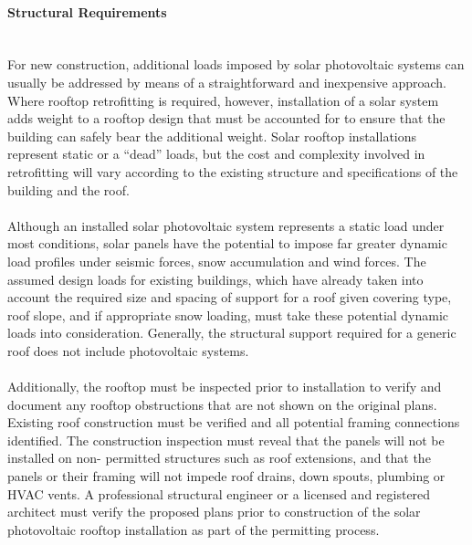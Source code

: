 \paragraph{Structural Requirements}\mbox{ }\\
For new construction, additional loads imposed by solar photovoltaic systems can usually be addressed by means of a straightforward and inexpensive approach. Where rooftop retrofitting is required, however, installation of a solar system adds weight to a rooftop design that must be accounted for to ensure that the building can safely bear the additional weight. Solar rooftop installations represent static or a “dead” loads, but the cost and complexity involved in retrofitting will vary according to the existing structure and specifications of the building and the roof.
\\\\
\noindent Although an installed solar photovoltaic system represents a static load under most conditions, solar panels have the potential to impose far greater dynamic load profiles under seismic forces, snow accumulation and wind forces. The assumed design loads for existing buildings, which have already taken into account the required size and spacing of support for a roof given covering type, roof slope, and if appropriate snow loading, must take these potential dynamic loads into consideration. Generally, the structural support required for a generic roof does not include photovoltaic systems.
\\\\
\noindent Additionally, the rooftop must be inspected prior to installation to verify and document any rooftop obstructions that are not shown on the original plans. Existing roof construction must be verified and all potential framing connections identified. The construction inspection must reveal that the panels will not be installed on non- permitted structures such as roof extensions, and that the panels or their framing will not impede roof drains, down spouts, plumbing or HVAC vents. A professional structural engineer or a licensed and registered architect must verify the proposed plans prior to construction of the solar photovoltaic rooftop installation as part of the permitting process.

